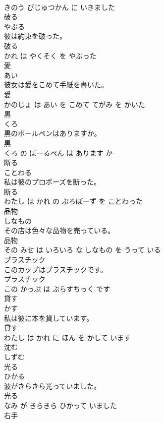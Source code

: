 \documentclass[8pt]{extreport}
\begin{document}
\begin{CJK}{UTF8}{min}
\\	きのう びじゅつかん に いきました			
\\	破る	
\\	やぶる			
\\	彼は約束を破った。	
\\	破る 
\\	かれ は やくそく を やぶった			
\\	愛	
\\	あい			
\\	彼女は愛をこめて手紙を書いた。	
\\	愛 
\\	かのじょ は あい を こめて てがみ を かいた			
\\	黒	
\\	くろ			
\\	黒のボールペンはありますか。	
\\	黒 
\\	くろ の ぼーるぺん は あります か			
\\	断る	
\\	ことわる			
\\	私は彼のプロポーズを断った。	
\\	断る 
\\	わたし は かれ の ぷろぽーず を ことわった			
\\	品物	
\\	しなもの			
\\	その店は色々な品物を売っている。	
\\	品物 
\\	その みせ は いろいろ な しなもの を うって いる			
\\	プラスチック	
\\	このカップはプラスチックです。	
\\	プラスチック 
\\	この かっぷ は ぷらすちっく です			
\\	貸す	
\\	かす			
\\	私は彼に本を貸しています。	
\\	貸す 
\\	わたし は かれ に ほん を かして います			
\\	沈む	
\\	しずむ			
\\	光る	
\\	ひかる			
\\	波がきらきら光っていました。	
\\	光る 
\\	なみ が きらきら ひかって いました			
\\	右手	

\end{CJK}
\end{document}
